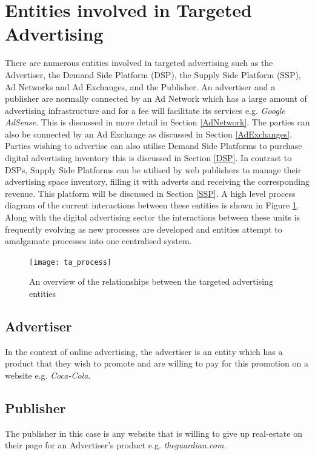 \documentclass[12pt]{article}
\begin{document}
\pagebreak

\section{Entities involved in Targeted Advertising} 
There are numerous entities involved in targeted advertising such as the Advertiser, the Demand Side Platform (DSP), the Supply Side Platform (SSP), Ad Networks and Ad Exchanges, and the Publisher. An advertiser and a publisher are normally connected by an Ad Network which has a large amount of advertising infrastructure and for a fee will facilitate its services e.g. \textit{Google AdSense}. This is discussed in more detail in Section \ref{AdNetwork}. The parties can also be connected by an Ad Exchange as discussed in Section \ref{AdExchanges}. Parties wishing to advertise can also utilise Demand Side Platforms to purchase digital advertising inventory this is discussed in Section \ref{DSP}. In contrast to DSPs, Supply Side Platforms can be utilised by web publishers to manage their advertising space inventory, filling it with adverts and receiving the corresponding revenue. This platform will be discussed in Section \ref{SSP}. A high level process diagram of the current interactions between these entities is shown in Figure \ref{fig:ta_process}. Along with the digital advertising sector the interactions between these units is frequently evolving as new processes are developed and entities attempt to amalgamate processes into one centralised system.

\begin{figure}[H]
    \centering
    \texttt{[image: ta\_process]}
    \caption{An overview of the relationships between the targeted advertising entities}
    \label{fig:ta_process}
\end{figure}

\subsection{Advertiser}
In the context of online advertising, the advertiser is an entity which has a product that they wish to promote and are willing to pay for this promotion on a website e.g. \textit{Coca-Cola}.

\subsection{Publisher} 
The publisher in this case is any website that is willing to give up real-estate on their page for an Advertiser's product e.g. \textit{theguardian.com}.
\end{document}

